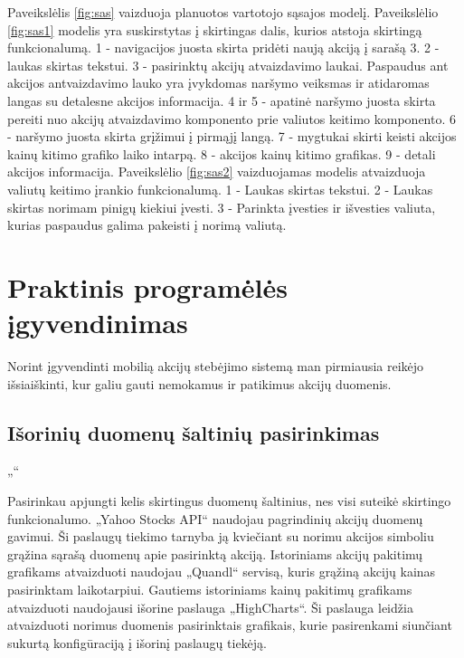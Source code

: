 \documentclass[a4paper,12pt,fleqn]{article}
\begin{document}
Paveikslėlis \ref{fig:sas} vaizduoja planuotos vartotojo sąsajos modelį. Paveikslėlio \ref{fig:sas1} modelis yra suskirstytas į skirtingas dalis, kurios atstoja skirtingą funkcionalumą. 1 - navigacijos juosta skirta pridėti naują akciją į sarašą 3. 2 - laukas skirtas tekstui. 3 - pasirinktų akcijų atvaizdavimo laukai. Paspaudus ant akcijos antvaizdavimo lauko yra įvykdomas naršymo veiksmas ir atidaromas langas su detalesne akcijos informacija. 4 ir 5 - apatinė naršymo juosta skirta pereiti nuo akcijų atvaizdavimo komponento prie valiutos keitimo komponento. 6 - naršymo juosta skirta grįžimui į pirmąjį langą. 7 - mygtukai skirti keisti akcijos kainų kitimo grafiko laiko intarpą. 8 - akcijos kainų kitimo grafikas. 9 - detali akcijos informacija. Paveikslėlio \ref{fig:sas2} vaizduojamas modelis atvaizduoja valiutų keitimo įrankio funkcionalumą. 1 - Laukas skirtas tekstui. 2 - Laukas skirtas norimam pinigų kiekiui įvesti. 3 - Parinkta įvesties ir išvesties valiuta, kurias paspaudus galima pakeisti į norimą valiutą.

\newpage
\section{Praktinis programėlės įgyvendinimas}
Norint įgyvendinti mobilią akcijų stebėjimo sistemą man pirmiausia reikėjo išsiaiškinti, kur galiu gauti nemokamus ir patikimus akcijų duomenis.
\subsection{Išorinių duomenų šaltinių pasirinkimas}

„“

Pasirinkau apjungti kelis skirtingus duomenų šaltinius, nes visi suteikė skirtingo funkcionalumo. „Yahoo Stocks API“ naudojau pagrindinių akcijų duomenų gavimui. Ši paslaugų tiekimo tarnyba ją kviečiant su norimu akcijos simboliu grąžina sąrašą duomenų apie pasirinktą akciją. Istoriniams akcijų pakitimų grafikams atvaizduoti naudojau „Quandl“ servisą, kuris grąžiną akcijų kainas pasirinktam laikotarpiui. Gautiems istoriniams kainų pakitimų grafikams atvaizduoti naudojausi išorine paslauga „HighCharts“. Ši paslauga leidžia atvaizduoti norimus duomenis pasirinktais grafikais, kurie pasirenkami siunčiant sukurtą konfigūraciją į išorinį paslaugų tiekėją.



\end{document}
